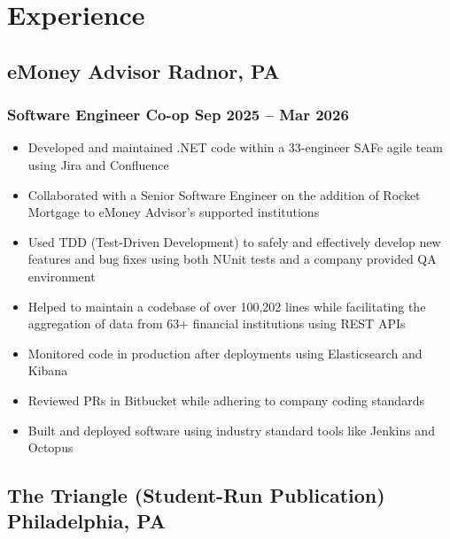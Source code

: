 \documentclass[10pt]{article}
\newcommand{\rside}[1]{
  \hfill {\normalfont\color{accent} #1}%
}
\begin{document}
\section{Experience}
\subsection{eMoney Advisor \rside{Radnor, PA}}
\subsubsection{Software Engineer Co-op \rside{Sep 2025 -- Mar 2026}}
\begin{itemize}
 \item Developed and maintained .NET code within a 33-engineer SAFe agile team using Jira and Confluence
 \item Collaborated with a Senior Software Engineer on the addition of Rocket Mortgage to eMoney Advisor's supported institutions
 \item Used TDD (Test-Driven Development) to safely and effectively develop new features and bug fixes using both NUnit tests and a company provided QA environment
 \item Helped to maintain a codebase of over 100,202 lines while facilitating the aggregation of data from 63+ financial institutions using REST APIs 
  \item Monitored code in production after deployments using Elasticsearch and Kibana
\item Reviewed PRs in Bitbucket while adhering to company coding standards 
 \item Built and deployed software using industry standard tools like Jenkins and Octopus
\end{itemize}
\subsection{The Triangle (Student-Run Publication) \rside{Philadelphia, PA}}
\end{document}
